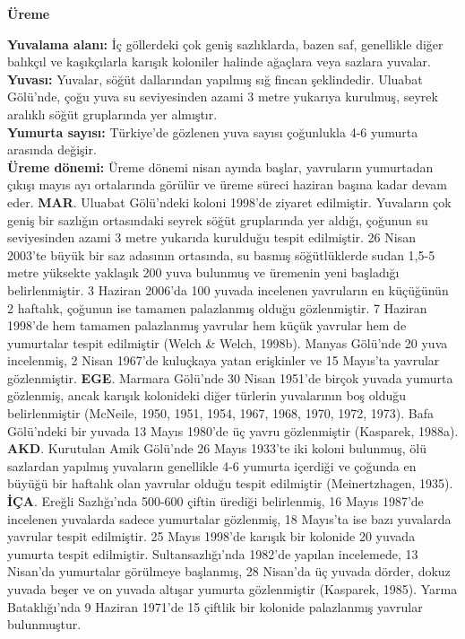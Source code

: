 \documentclass[
  a4paper,
  DIV=11,
  numbers=noendperiod]{scrreprt}
\begin{document}
\textbf{Üreme}

\textbf{Yuvalama alanı:} İç göllerdeki çok geniş sazlıklarda, bazen saf,
genellikle diğer balıkçıl ve kaşıkçılarla karışık koloniler halinde
ağaçlara veya sazlara yuvalar.\\
\textbf{Yuvası:} Yuvalar, söğüt dallarından yapılmış sığ fincan
şeklindedir. Uluabat Gölü'nde, çoğu yuva su seviyesinden azami 3 metre
yukarıya kurulmuş, seyrek aralıklı söğüt gruplarında yer almıştır.\\
\textbf{Yumurta sayısı:} Türkiye'de gözlenen yuva sayısı çoğunlukla 4-6
yumurta arasında değişir.\\
\textbf{Üreme dönemi:} Üreme dönemi nisan ayında başlar, yavruların
yumurtadan çıkışı mayıs ayı ortalarında görülür ve üreme süreci haziran
başına kadar devam eder. \textbf{MAR}. Uluabat Gölü'ndeki koloni 1998'de
ziyaret edilmiştir. Yuvaların çok geniş bir sazlığın ortasındaki seyrek
söğüt gruplarında yer aldığı, çoğunun su seviyesinden azami 3 metre
yukarıda kurulduğu tespit edilmiştir. 26 Nisan 2003'te büyük bir saz
adasının ortasında, su basmış söğütlüklerde sudan 1,5-5 metre yüksekte
yaklaşık 200 yuva bulunmuş ve üremenin yeni başladığı belirlenmiştir. 3
Haziran 2006'da 100 yuvada incelenen yavruların en küçüğünün 2 haftalık,
çoğunun ise tamamen palazlanmış olduğu gözlenmiştir. 7 Haziran 1998'de
hem tamamen palazlanmış yavrular hem küçük yavrular hem de yumurtalar
tespit edilmiştir (Welch \& Welch, 1998b). Manyas Gölü'nde 20 yuva
incelenmiş, 2 Nisan 1967'de kuluçkaya yatan erişkinler ve 15 Mayıs'ta
yavrular gözlenmiştir. \textbf{EGE}. Marmara Gölü'nde 30 Nisan 1951'de
birçok yuvada yumurta gözlenmiş, ancak karışık kolonideki diğer türlerin
yuvalarının boş olduğu belirlenmiştir (McNeile, 1950, 1951, 1954, 1967,
1968, 1970, 1972, 1973). Bafa Gölü'ndeki bir yuvada 13 Mayıs 1980'de üç
yavru gözlenmiştir (Kasparek, 1988a). \textbf{AKD}. Kurutulan Amik
Gölü'nde 26 Mayıs 1933'te iki koloni bulunmuş, ölü sazlardan yapılmış
yuvaların genellikle 4-6 yumurta içerdiği ve çoğunda en büyüğü bir
haftalık olan yavrular olduğu tespit edilmiştir (Meinertzhagen, 1935).
\textbf{İÇA}. Ereğli Sazlığı'nda 500-600 çiftin ürediği belirlenmiş, 16
Mayıs 1987'de incelenen yuvalarda sadece yumurtalar gözlenmiş, 18
Mayıs'ta ise bazı yuvalarda yavrular tespit edilmiştir. 25 Mayıs 1998'de
karışık bir kolonide 20 yuvada yumurta tespit edilmiştir.
Sultansazlığı'nda 1982'de yapılan incelemede, 13 Nisan'da yumurtalar
görülmeye başlanmış, 28 Nisan'da üç yuvada dörder, dokuz yuvada beşer ve
on yuvada altışar yumurta gözlenmiştir (Kasparek, 1985). Yarma
Bataklığı'nda 9 Haziran 1971'de 15 çiftlik bir kolonide palazlanmış
yavrular bulunmuştur.
\end{document}
